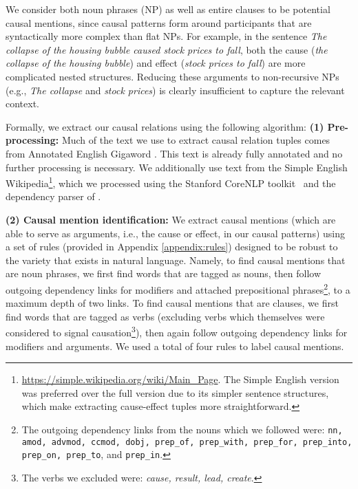 We consider both noun phrases (NP) as well as entire %
clauses to be potential causal mentions, since causal patterns form around participants that are syntactically more complex than flat NPs.  
For example, in the sentence \emph{The collapse of the housing bubble caused stock prices to fall}, both the cause ({\em the collapse of the housing bubble}) and effect ({\em stock prices to fall}) are more complicated nested structures.  Reducing these arguments to non-recursive NPs (e.g., {\em The collapse} and {\em stock prices}) is clearly insufficient to capture the relevant context.

Formally, we extract our causal relations using the following algorithm:
{\flushleft \textbf{(1) Pre-processing:}} Much of the text we use to extract causal relation tuples comes from Annotated English Gigaword \citep{napoles2012annotated}.  This text is already fully annotated and no further processing is necessary.  We additionally use text from the Simple English Wikipedia\footnote{{\scriptsize \url{https://simple.wikipedia.org/wiki/Main_Page}}.  The Simple English version was preferred over the full version due to its simpler sentence structures, which make extracting cause-effect tuples more straightforward.}, which we processed using the Stanford CoreNLP toolkit~\citep{Manning:14} and the dependency parser of \citet{chen14}.

{\flushleft \textbf{(2) Causal mention identification:}} \label{step:cm} We extract causal mentions (which are able to serve as arguments, i.e., the cause or effect,  in our causal patterns) using a set of rules (provided in Appendix \ref{appendix:rules}) 
designed to be robust to the variety that exists in natural language. %
Namely, to find causal mentions that are noun phrases, we first find words that are tagged as nouns, then follow outgoing dependency links for modifiers and attached prepositional phrases\footnote{The outgoing dependency links from the nouns which we followed were: \texttt{nn, amod, advmod, ccmod, dobj, prep\_of, prep\_with, prep\_for, prep\_into, prep\_on, prep\_to}, and \texttt{prep\_in}.}, to a maximum depth of two links.  To find causal mentions that are clauses, we first find words that are tagged as verbs (excluding verbs which themselves were considered to signal causation\footnote{The verbs we excluded were: \emph{cause, result, lead, create}.}), then again follow outgoing dependency links for modifiers and arguments.  We used a total of four rules to label causal mentions.%

